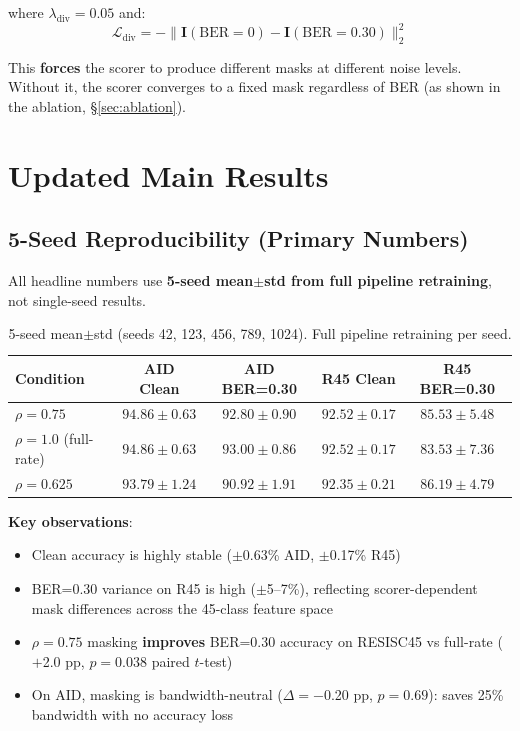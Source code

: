 \documentclass[11pt]{article}
\begin{document}
where $\lambda_{\text{div}} = 0.05$ and:
\[
\mathcal{L}_{\text{div}} = -\|\mathbf{I}(\text{BER}{=}0) - \mathbf{I}(\text{BER}{=}0.30)\|_2^2
\]

This \textbf{forces} the scorer to produce different masks at different noise levels. Without it, the scorer converges to a fixed mask regardless of BER (as shown in the ablation, \S\ref{sec:ablation}).

\section{Updated Main Results}

\subsection{5-Seed Reproducibility (Primary Numbers)}

All headline numbers use \textbf{5-seed mean$\pm$std from full pipeline retraining}, not single-seed results.

\begin{table}[H]
\centering
\caption{5-seed mean$\pm$std (seeds 42, 123, 456, 789, 1024). Full pipeline retraining per seed.}
\label{tab:5seed}
\begin{tabular}{l cccc}
\toprule
\textbf{Condition} & \textbf{AID Clean} & \textbf{AID BER=0.30} & \textbf{R45 Clean} & \textbf{R45 BER=0.30} \\
\midrule
$\rho{=}0.75$ & $94.86 \pm 0.63$ & $92.80 \pm 0.90$ & $92.52 \pm 0.17$ & $85.53 \pm 5.48$ \\
$\rho{=}1.0$ (full-rate)  & $94.86 \pm 0.63$ & $93.00 \pm 0.86$ & $92.52 \pm 0.17$ & $83.53 \pm 7.36$ \\
$\rho{=}0.625$ & $93.79 \pm 1.24$ & $90.92 \pm 1.91$ & $92.35 \pm 0.21$ & $86.19 \pm 4.79$ \\
\bottomrule
\end{tabular}
\end{table}

\textbf{Key observations}:
\begin{itemize}[nosep]
    \item Clean accuracy is highly stable ($\pm$0.63\% AID, $\pm$0.17\% R45)
    \item BER=0.30 variance on R45 is high ($\pm$5--7\%), reflecting scorer-dependent mask differences across the 45-class feature space
    \item $\rho{=}0.75$ masking \textbf{improves} BER=0.30 accuracy on RESISC45 vs full-rate ($+$2.0 pp, $p{=}0.038$ paired $t$-test)
    \item On AID, masking is bandwidth-neutral ($\Delta{=}-$0.20 pp, $p{=}0.69$): saves 25\% bandwidth with no accuracy loss
\end{itemize}
\end{document}
